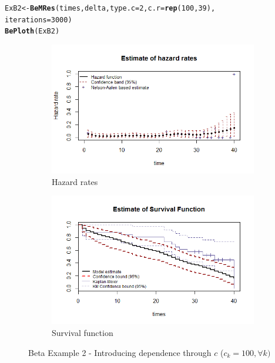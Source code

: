 \documentclass[letterpaper]{article}\usepackage[]{graphicx}\usepackage[]{color}
\makeatletter
\newcommand{\hlnum}[1]{\textcolor[rgb]{0.686,0.059,0.569}{#1}}%
\newcommand{\hlstd}[1]{\textcolor[rgb]{0.345,0.345,0.345}{#1}}%
\newcommand{\hlkwb}[1]{\textcolor[rgb]{0.69,0.353,0.396}{#1}}%
\newcommand{\hlkwc}[1]{\textcolor[rgb]{0.333,0.667,0.333}{#1}}%
\newcommand{\hlkwd}[1]{\textcolor[rgb]{0.737,0.353,0.396}{\textbf{#1}}}%
\newenvironment{kframe}{%
 \def\at@end@of@kframe{}%
 \ifinner\ifhmode%
  \def\at@end@of@kframe{\end{minipage}}%
  \begin{minipage}{\columnwidth}%
 \fi\fi%
 \def\FrameCommand##1{\hskip\@totalleftmargin \hskip-\fboxsep
 \colorbox{shadecolor}{##1}\hskip-\fboxsep
     \hskip-\linewidth \hskip-\@totalleftmargin \hskip\columnwidth}%
 \MakeFramed {\advance\hsize-\width
   \@totalleftmargin\z@ \linewidth\hsize
   \@setminipage}}%
 {\par\unskip\endMakeFramed%
 \at@end@of@kframe}
\newenvironment{knitrout}{}{} %
\makeatother
\begin{document}
\begin{knitrout}
\color{fgcolor}\begin{kframe}
\begin{alltt}
\hlstd{ExB2} \hlkwb{<-} \hlkwd{BeMRes}\hlstd{(times, delta,} \hlkwc{type.c} \hlstd{=} \hlnum{2}\hlstd{,} \hlkwc{c.r} \hlstd{=} \hlkwd{rep}\hlstd{(}\hlnum{100}\hlstd{,} \hlnum{39}\hlstd{),}
               \hlkwc{iterations} \hlstd{=} \hlnum{3000}\hlstd{)}
\hlkwd{BePloth}\hlstd{(ExB2)}
\end{alltt}
\end{kframe}
\end{knitrout}

\begin{figure}
  \centering
  \begin{subfigure}[a]{\textwidth}\centering
    \includegraphics[width=\textwidth]{B21.png}
    \caption{Hazard rates}
  \end{subfigure}
  \begin{subfigure}[b]{\textwidth}\centering
    \includegraphics[width=\textwidth]{B22.png}
    \caption{Survival function}
  \end{subfigure}
  \caption{Beta Example 2 - Introducing dependence through $c$ ($c_k=100, \forall k)$}
  \label{fig:B2}
\end{figure}
\end{document}
